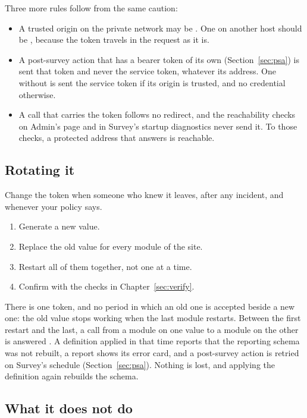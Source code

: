\documentclass[11pt, a4paper]{article}
\begin{document}
Three more rules follow from the same caution:

\begin{itemize}
  \item A trusted origin on the private network may be . One on another host
        should be , because the token travels in the request as it is.
  \item A post-survey action that has a bearer token of its own (Section~\ref{sec:psa}) is
        sent that token and never the service token, whatever its address. One without is
        sent the service token if its origin is trusted, and no credential otherwise.
  \item A call that carries the token follows no redirect, and the reachability checks on
        Admin's  page and in Survey's startup diagnostics never send it. To
        those checks, a protected address that answers  is reachable.
\end{itemize}

\subsection{Rotating it}
\label{sec:service-token-rotate}

Change the token when someone who knew it leaves, after any incident, and whenever your policy
says.

\begin{enumerate}
  \item Generate a new value.
  \item Replace the old value for every module of the site.
  \item Restart all of them together, not one at a time.
  \item Confirm with the checks in Chapter~\ref{sec:verify}.
\end{enumerate}

There is one token, and no period in which an old one is accepted beside a new one: the old
value stops working when the last module restarts. Between the first restart and the last, a
call from a module on one value to a module on the other is answered . A definition
applied in that time reports that the reporting schema was not rebuilt, a report shows its
error card, and a post-survey action is retried on Survey's schedule (Section~\ref{sec:psa}).
Nothing is lost, and applying the definition again rebuilds the schema.

\subsection{What it does not do}
\label{sec:service-token-limits}
\end{document}
